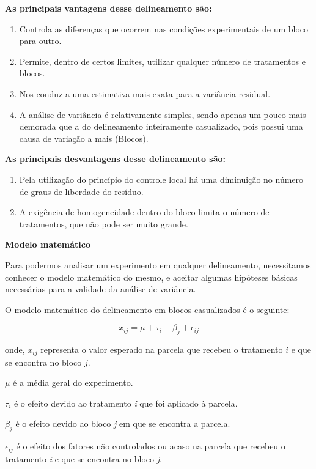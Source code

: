 \documentclass[
]{book}
\begin{document}
\textbf{As principais vantagens desse delineamento são:}

\begin{enumerate}
\def\labelenumi{\arabic{enumi}.}
\item
  Controla as diferenças que ocorrem nas condições experimentais de um bloco para outro.
\item
  Permite, dentro de certos limites, utilizar qualquer número de tratamentos e blocos.
\item
  Nos conduz a uma estimativa mais exata para a variância residual.
\item
  A análise de variância é relativamente simples, sendo apenas um pouco mais demorada que a do delineamento inteiramente casualizado, pois possui uma causa de variação a mais (Blocos).
\end{enumerate}

\textbf{As principais desvantagens desse delineamento são:}

\begin{enumerate}
\def\labelenumi{\arabic{enumi}.}
\item
  Pela utilização do princípio do controle local há uma diminuição no número de graus de liberdade do resíduo.
\item
  A exigência de homogeneidade dentro do bloco limita o número de tratamentos, que não pode ser muito grande.
\end{enumerate}

\textbf{Modelo matemático}

Para podermos analisar um experimento em qualquer delineamento, necessitamos conhecer o modelo matemático do mesmo, e aceitar algumas hipóteses básicas necessárias para a validade da análise de variância.

O modelo matemático do delineamento em blocos casualizados é o seguinte:

\[
x_{ij} = \mu +\tau_i + \beta_j+\epsilon_{ij}
\]

onde,
\(x_{ij}\) representa o valor esperado na parcela que recebeu o tratamento \(i\) e que se encontra no bloco \(j\).

\(\mu\) é a média geral do experimento.

\(\tau_i\) é o efeito devido ao tratamento \emph{i} que foi aplicado à parcela.

\(\beta_j\) é o efeito devido ao bloco \emph{j} em que se encontra a parcela.

\(\epsilon_{ij}\) é o efeito dos fatores não controlados ou acaso na parcela que recebeu o tratamento \emph{i} e que se encontra no bloco \emph{j}.
\end{document}
